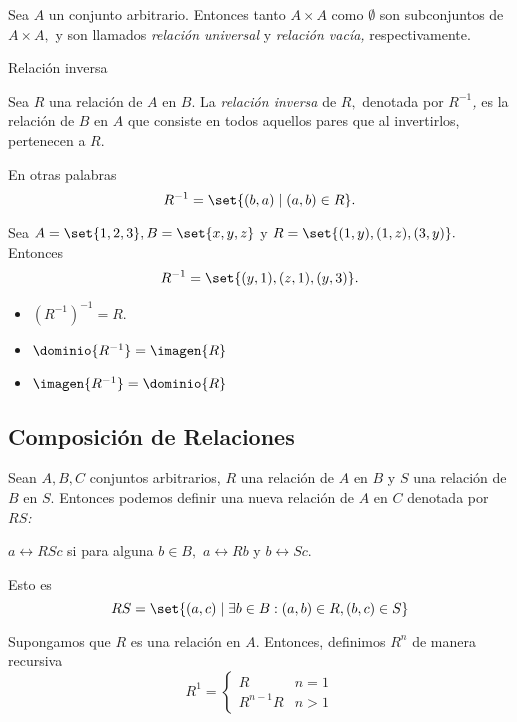 	Sea $A$ un conjunto arbitrario. Entonces tanto $A\times A$ como $\emptyset$ son subconjuntos de $A \times A,$ y son llamados \emph{relación universal} y \emph{relación vacía,} respectivamente.



	{Relación inversa}
	
	Sea $R$ una relación de $A$ en $B.$ La \emph{relación inversa} de $R,$ denotada por \emph{$R^{-1}$,} es la relación de $B$ en $A$ que consiste en todos aquellos pares que al invertirlos, pertenecen a $R.$ 
	
	En otras palabras
	$$
	R^{-1}=\set{(b,a)\mid (a,b)\in R}.
	$$



	\begin{ejemplo}
		Sea $A=\set{1,2,3}, B=\set{x,y,z}$ y $R=\set{(1,y),(1,z),(3,y)}.$ Entonces
		$$
		R^{-1}=\set{(y,1), (z,1), (y,3)}.
		$$
	\end{ejemplo}



	\begin{observacion}
		\begin{itemize}
			\item $\left( R^{-1} \right)^{-1}=R.$
			\item $\dominio{R^{-1}}=\imagen{R}$
			\item $\imagen{R^{-1}}=\dominio{R}$
		\end{itemize}
	\end{observacion}




\subsection{Composición de Relaciones}

	Sean $A,B,C$ conjuntos arbitrarios, $R$ una relación de $A$ en $B$ y $S$ una relación de $B$ en $S.$  Entonces podemos definir una nueva relación de $A$ en $C$ denotada por \emph{$RS$:}
	\begin{center}
		$a\rel{{RS}}c$ si para alguna $b \in B,$ $a\rel{R}b$ y $b\rel{S}c.$
	\end{center} 



	Esto es
	$$
	RS=\set{(a,c)\mid \exists b\in B: (a,b)\in R, (b,c)\in S}
	$$



	Supongamos que $R$ es una relación en $A.$ Entonces, definimos $R^{n}$ de manera recursiva
	$$
	R^{1}=
	\begin{cases}
		R & n=1 \\
		R^{n-1}R & n>1
	\end{cases}
	$$




